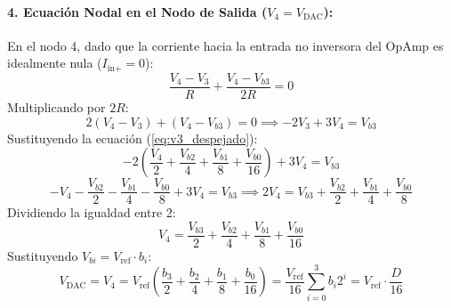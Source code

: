 \documentclass[11pt,letterpaper]{article}
\begin{document}
\paragraph{4. Ecuación Nodal en el Nodo de Salida ($V_4 = V_{\text{DAC}}$):}
En el nodo 4, dado que la corriente hacia la entrada no inversora del OpAmp es idealmente nula ($I_{\text{in+}} = 0$):
\begin{equation}
\frac{V_4 - V_3}{R} + \frac{V_4 - V_{b3}}{2R} = 0
\label{eq:lck_nodo4}
\end{equation}
Multiplicando por $2R$:
\begin{equation}
2(V_4 - V_3) + (V_4 - V_{b3}) = 0 \implies -2V_3 + 3V_4 = V_{b3}
\end{equation}
Sustituyendo la ecuación (\ref{eq:v3_despejado}):
\begin{equation}
-2\left( \frac{V_4}{2} + \frac{V_{b2}}{4} + \frac{V_{b1}}{8} + \frac{V_{b0}}{16} \right) + 3V_4 = V_{b3}
\end{equation}
\begin{equation}
-V_4 - \frac{V_{b2}}{2} - \frac{V_{b1}}{4} - \frac{V_{b0}}{8} + 3V_4 = V_{b3} \implies 2V_4 = V_{b3} + \frac{V_{b2}}{2} + \frac{V_{b1}}{4} + \frac{V_{b0}}{8}
\end{equation}
Dividiendo la igualdad entre 2:
\begin{equation}
V_4 = \frac{V_{b3}}{2} + \frac{V_{b2}}{4} + \frac{V_{b1}}{8} + \frac{V_{b0}}{16}
\label{eq:v4_fracciones}
\end{equation}
Sustituyendo $V_{bi} = V_{\text{ref}} \cdot b_i$:
\begin{equation}
\boxed{V_{\text{DAC}} = V_4 = V_{\text{ref}} \left( \frac{b_3}{2} + \frac{b_2}{4} + \frac{b_1}{8} + \frac{b_0}{16} \right) = \frac{V_{\text{ref}}}{16} \sum_{i=0}^{3} b_i 2^i = V_{\text{ref}} \cdot \frac{D}{16}}
\label{eq:vdac_final}
\end{equation}
\end{document}
